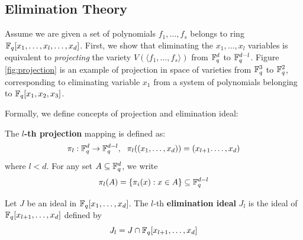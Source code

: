 \subsection{Elimination Theory}
Assume we are given a set of polynomials $f_1,\dots,f_s$ belongs to ring ${\mathbb{F}}_{q}[x_1,\dots,x_l,\dots,x_d]$.
First, we show that eliminating the $x_1,\dots,x_l$ variables is equivalent to 
{\it projecting} the variety $V(\langle f_1,\dots,f_s\rangle)$ from 
${\mathbb{F}}_{q}^d$ to ${\mathbb{F}}_{q}^{d-l}$. Figure \ref{fig:projection} is an example of projection in space of varieties
from ${\mathbb{F}}_{q}^3$ to ${\mathbb{F}}_{q}^2$, corresponding to eliminating variable $x_1$ from 
a system of polynomials belonging to ${\mathbb{F}}_{q}[x_1,x_2,x_3]$.

\begin{figure}[H]
\end{figure}

Formally, we define concepts of projection and elimination ideal:
\begin{Definition}
The {\bf $l$-th projection} mapping is defined as:
$$\pi_l:{\mathbb{F}}_{q}^d\to{\mathbb{F}}_{q}^{d-l},~~\pi_l((x_1,\dots,x_d)) = (x_{l+1}.\dots,x_d)$$
where $l<d$. For any set $A \subseteq {\mathbb{F}}_{q}^d$, we write 
$$\pi_l(A) = \{\pi_i(x):x\in A\}\subseteq {\mathbb{F}}_{q}^{d-l}$$
\end{Definition}

\begin{Definition}
Let $J$ be an ideal in  ${\mathbb{F}}_{q}[x_1,\dots,x_d]$. The $l$-th 
{\bf elimination ideal} $J_l$ is the ideal of ${\mathbb{F}}_{q}[x_{l+1},\dots,x_d]$ defined
by
\begin{equation}
J_l = J \cap {\mathbb{F}}_{q}[x_{l+1},\dots,x_d]
\end{equation}
\end{Definition}

